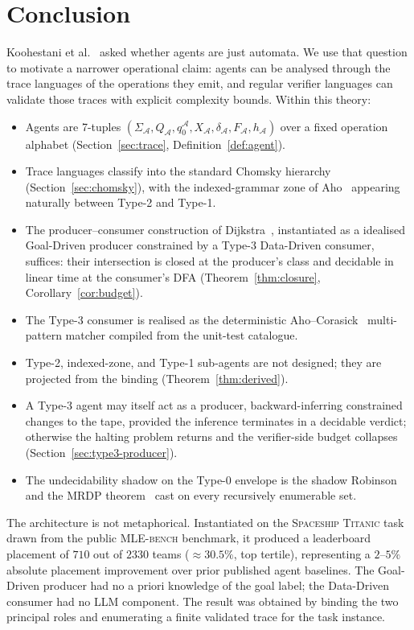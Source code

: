 \section{Conclusion}
\label{sec:conclusion}

Koohestani et al.~\cite{koohestani2025automata} asked whether
agents are just automata.  We use that question to motivate a
narrower operational claim: agents can be analysed through the
trace languages of the operations they emit, and regular verifier
languages can validate those traces with explicit complexity
bounds.  Within this theory:
\begin{itemize}
\item Agents are 7-tuples
$(\Sigma_\mathcal{A},Q_\mathcal{A},q_0^\mathcal{A},X_\mathcal{A},
\delta_\mathcal{A},F_\mathcal{A},h_\mathcal{A})$ over a fixed
operation alphabet
(Section~\ref{sec:trace}, Definition~\ref{def:agent}).
\item Trace languages classify into the standard
Chomsky hierarchy (Section~\ref{sec:chomsky}), with the
indexed-grammar zone of Aho~\cite{aho1968indexed}
appearing naturally between Type-2 and Type-1.
\item The producer--consumer construction of
Dijkstra~\cite{dijkstra1968cooperating}, instantiated as a
idealised Goal-Driven producer constrained by a Type-3 Data-Driven
consumer, suffices: their intersection is closed at the
producer's class and decidable in linear time at the consumer's
DFA (Theorem~\ref{thm:closure},
Corollary~\ref{cor:budget}).
\item The Type-3 consumer is realised as the deterministic
Aho--Corasick~\cite{aho1975corasick} multi-pattern matcher
compiled from the unit-test catalogue.
\item Type-2, indexed-zone, and Type-1 sub-agents are not
designed; they are projected from the binding
(Theorem~\ref{thm:derived}).
\item A Type-3 agent may itself act as a producer,
backward-inferring constrained changes to the tape, provided the
inference terminates in a decidable verdict; otherwise the
halting problem returns and the verifier-side budget collapses
(Section~\ref{sec:type3-producer}).
\item The undecidability shadow on the Type-0 envelope is the
shadow Robinson and the MRDP
theorem~\cite{robinson1949definability,davis1961decision} cast
on every recursively enumerable set.
\end{itemize}

The architecture is not metaphorical.  Instantiated on the
\textsc{Spaceship Titanic} task drawn from the public
\textsc{MLE-bench} benchmark, it produced a leaderboard placement
of $710$ out of $2330$ teams ($\approx\!30.5\%$, top tertile),
representing a $2$--$5\%$ absolute placement improvement over
prior published agent baselines.  The Goal-Driven producer had
no a priori knowledge of the goal label; the Data-Driven
consumer had no LLM component.  The result was obtained by binding the two principal roles and
enumerating a finite validated trace for the task instance.

